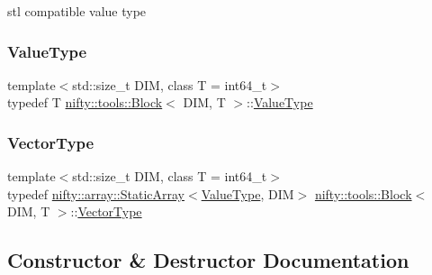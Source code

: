 stl compatible value type 

\mbox{\label{classnifty_1_1tools_1_1Block_a3e77342701a32fcc670d398f1b9bc6d4}} 
\subsubsection{\texorpdfstring{Value\+Type}{ValueType}}
{\footnotesize\ttfamily template$<$std\+::size\+\_\+t D\+IM, class T  = int64\+\_\+t$>$ \\
typedef T \hyperlink{classnifty_1_1tools_1_1Block}{nifty\+::tools\+::\+Block}$<$ D\+IM, T $>$\+::\hyperlink{classnifty_1_1tools_1_1Block_a3e77342701a32fcc670d398f1b9bc6d4}{Value\+Type}}

\mbox{\label{classnifty_1_1tools_1_1Block_aa077b4ebbf3e4e9b679d1957ca10ba32}} 
\subsubsection{\texorpdfstring{Vector\+Type}{VectorType}}
{\footnotesize\ttfamily template$<$std\+::size\+\_\+t D\+IM, class T  = int64\+\_\+t$>$ \\
typedef \hyperlink{namespacenifty_1_1array_a683f151f19c851754e0c6d55ed16a0c2}{nifty\+::array\+::\+Static\+Array}$<$\hyperlink{classnifty_1_1tools_1_1Block_a3e77342701a32fcc670d398f1b9bc6d4}{Value\+Type}, D\+IM$>$ \hyperlink{classnifty_1_1tools_1_1Block}{nifty\+::tools\+::\+Block}$<$ D\+IM, T $>$\+::\hyperlink{classnifty_1_1tools_1_1Block_aa077b4ebbf3e4e9b679d1957ca10ba32}{Vector\+Type}}



\subsection{Constructor \& Destructor Documentation}
\mbox{\label{classnifty_1_1tools_1_1Block_ab4fe7e24f2d3cd64b75a4e58b314170e}} 
